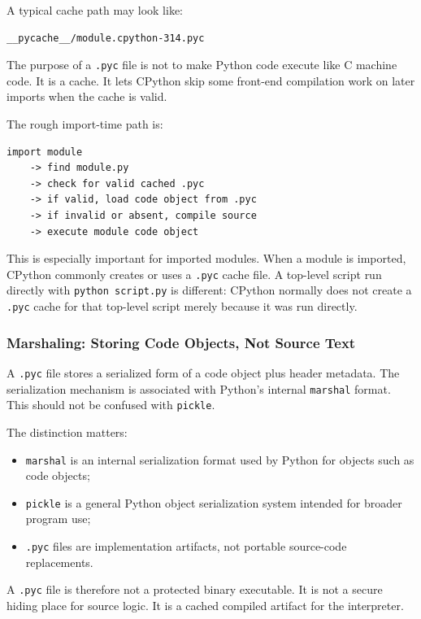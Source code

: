 A typical cache path may look like:

\begin{verbatim}
__pycache__/module.cpython-314.pyc
\end{verbatim}

The purpose of a \texttt{.pyc} file is not to make Python code execute like C machine code. It is a cache. It lets CPython skip some front-end compilation work on later imports when the cache is valid.

The rough import-time path is:

\begin{verbatim}
import module
    -> find module.py
    -> check for valid cached .pyc
    -> if valid, load code object from .pyc
    -> if invalid or absent, compile source
    -> execute module code object
\end{verbatim}

This is especially important for imported modules. When a module is imported, CPython commonly creates or uses a \texttt{.pyc} cache file. A top-level script run directly with \texttt{python script.py} is different: CPython normally does not create a \texttt{.pyc} cache for that top-level script merely because it was run directly.

\subsubsection{Marshaling: Storing Code Objects, Not Source Text}

A \texttt{.pyc} file stores a serialized form of a code object plus header metadata. The serialization mechanism is associated with Python's internal \texttt{marshal} format. This should not be confused with \texttt{pickle}.

The distinction matters:

\begin{itemize}
    \item \texttt{marshal} is an internal serialization format used by Python for objects such as code objects;
    \item \texttt{pickle} is a general Python object serialization system intended for broader program use;
    \item \texttt{.pyc} files are implementation artifacts, not portable source-code replacements.
\end{itemize}

A \texttt{.pyc} file is therefore not a protected binary executable. It is not a secure hiding place for source logic. It is a cached compiled artifact for the interpreter.

